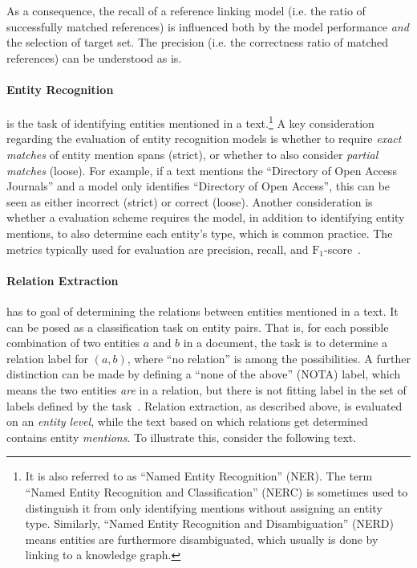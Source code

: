 As a consequence, the recall of a reference linking model (i.e. the ratio of successfully matched references) is influenced both by the model performance \emph{and} the selection of target set. The precision (i.e. the correctness ratio of matched references) can be understood as is.

\paragraph{Entity Recognition}
is the task of identifying entities mentioned in a text.\footnote{It is also referred to as ``Named Entity Recognition'' (NER). The term ``Named Entity Recognition and Classification'' (NERC) is sometimes used to distinguish it from only identifying mentions without assigning an entity type. Similarly, ``Named Entity Recognition and Disambiguation'' (NERD) means entities are furthermore disambiguated, which usually is done by linking to a knowledge graph.}
A key consideration regarding the evaluation of entity recognition models is whether to require \emph{exact matches} of entity mention spans (strict), or whether to also consider \emph{partial matches} (loose). For example, if a text mentions the ``Directory of Open Access Journals'' and a model only identifies ``Directory of Open Access'', this can be seen as either incorrect (strict) or correct (loose). Another consideration is whether a evaluation scheme requires the model, in addition to identifying entity mentions, to also determine each entity's type, which is common practice. The metrics typically used for evaluation are precision, recall, and $\text{F}_1$-score~\cite{Goyal2018}.


\paragraph{Relation Extraction}
has to goal of determining the relations between entities mentioned in a text. It can be posed as a classification task on entity pairs. That is, for each possible combination of two entities $a$ and $b$ in a document, the task is to determine a relation label for $(a, b)$, where ``no relation'' is among the possibilities. A further distinction can be made by defining a ``none of the above'' (NOTA) label, which means the two entities \emph{are} in a relation, but there is not fitting label in the set of labels defined by the task~\cite{Bassignana2022}. %
Relation extraction, as described above, is evaluated on an \emph{entity level}, while the text based on which relations get determined contains entity \emph{mentions}. To illustrate this, consider the following text.

